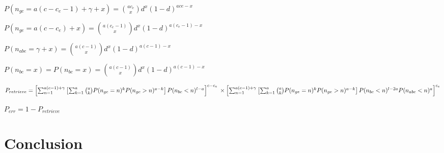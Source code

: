 \documentclass[english,11pt,twocolumn]{article}
\theoremstyle{definition}
\begin{document}
	$P(n_{gc} = a(c - c_e - 1) + \gamma + x) = {a c_e \choose x} d^x (1-d)^{a ce-x}$
	
	$P(n_{ge} = a(c - c_e) + x) = {a (c_e - 1) \choose x} d^x (1-d)^{a (c_e - 1)-x}$
	
	$P(n_{abe} = \gamma + x) = {a(c - 1) \choose x} d^x (1-d)^{a(c-1)-x}$
	
	$P(n_{be} = x) = P(n_{bc} = x) = {a(c - 1) \choose x} d^x (1-d)^{a(c- 1) -x}$	

	
	
	$P_{retrieve} = \left [ \sum_{n = 1}^{a(c-1) + \gamma} \left [ \sum_{k = 1}^{a} { a \choose k }   P(n_{gc} = n)^k P(n_{gc} > n)^{a-k} \right ] P(n_{bc} < n)^{l-a} \right ]^{c - c_e} \\ \times \left [ \sum_{n = 1}^{a(c-1) +\gamma} \left[ \sum_{k = 1}^a { a \choose k } P(n_{ge} = n)^k P(n_{ge} > n)^{a-k} \right ] P(n_{bc} < n)^{l-2a} P(n_{abc} < n)^a \right ]^{c_e}
	$
	
	$P_{err} = 1 - P_{retrieve}$
	


	\section{Conclusion}	
	
	
	\nocite{*}
         
\end{document}
